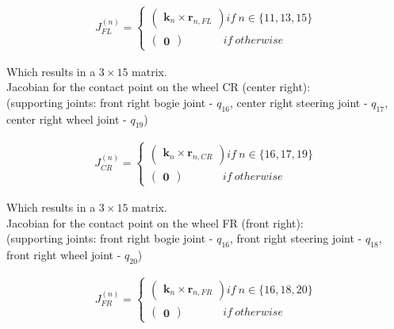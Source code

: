 \documentclass[a4paper]{article}
\begin{document}
\begin{align}
J^{(n)}_{FL} =
\begin{cases}
        \begin{pmatrix} \boldsymbol{k}_{n} \times \boldsymbol{r}_{n, FL} \end{pmatrix} if \ n \in \{11, 13, 15\}\\
        \begin{pmatrix} \boldsymbol{0} \end{pmatrix} \ \ \ \ \ \ \ \ \ \ \ \ \ \ \ \ if \  otherwise
\end{cases}
\end{align}

\noindent Which results in a $3 \times 15$ matrix. \\

\noindent Jacobian for the contact point on the wheel CR (center right): \\
\noindent (supporting joints: front right bogie joint - $q_{16}$, center right steering joint - $q_{17}$, center right wheel joint - $q_{19}$)

\begin{align}
J^{(n)}_{CR} =
\begin{cases}
        \begin{pmatrix} \boldsymbol{k}_{n} \times \boldsymbol{r}_{n, CR} \end{pmatrix} if \ n \in \{16, 17, 19\}\\
        \begin{pmatrix} \boldsymbol{0} \end{pmatrix} \ \ \ \ \ \ \ \ \ \ \ \ \ \ \ \ if \  otherwise
\end{cases}
\end{align}

\noindent Which results in a $3 \times 15$ matrix. \\

\noindent Jacobian for the contact point on the wheel FR (front right): \\
\noindent (supporting joints: front right bogie joint - $q_{16}$, front right steering joint - $q_{18}$, front right wheel joint - $q_{20}$)

\begin{align}
J^{(n)}_{FR} =
\begin{cases}
        \begin{pmatrix} \boldsymbol{k}_{n} \times \boldsymbol{r}_{n, FR} \end{pmatrix} if \ n \in \{16, 18, 20\}\\
        \begin{pmatrix} \boldsymbol{0} \end{pmatrix} \ \ \ \ \ \ \ \ \ \ \ \ \ \ \ \ if \  otherwise
\end{cases}
\end{align}
\end{document}
